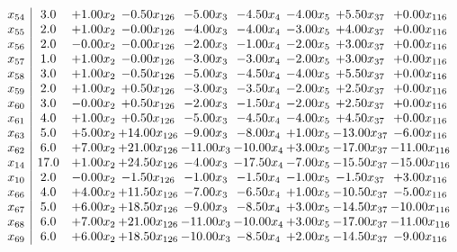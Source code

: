 \documentclass[8pt]{article}
\begin{document}
\[\begin{array}{c| c c@{\hskip 2pt} c@{\hskip 2pt} c@{\hskip 2pt} c@{\hskip 2pt} c@{\hskip 2pt} c@{\hskip 2pt} c@{\hskip 2pt} }
 x_{54}   &  3.0 & +  1.00 x_{2} & -0.50 x_{126} & -5.00 x_{3} & -4.50 x_{4} & -4.00 x_{5} & +  5.50 x_{37} & +  0.00 x_{116}\\
 x_{55}   &  2.0 & +  1.00 x_{2} & -0.00 x_{126} & -4.00 x_{3} & -4.00 x_{4} & -3.00 x_{5} & +  4.00 x_{37} & +  0.00 x_{116}\\
 x_{56}   &  2.0 & -0.00 x_{2} & -0.00 x_{126} & -2.00 x_{3} & -1.00 x_{4} & -2.00 x_{5} & +  3.00 x_{37} & +  0.00 x_{116}\\
 x_{57}   &  1.0 & +  1.00 x_{2} & -0.00 x_{126} & -3.00 x_{3} & -3.00 x_{4} & -2.00 x_{5} & +  3.00 x_{37} & +  0.00 x_{116}\\
 x_{58}   &  3.0 & +  1.00 x_{2} & -0.50 x_{126} & -5.00 x_{3} & -4.50 x_{4} & -4.00 x_{5} & +  5.50 x_{37} & +  0.00 x_{116}\\
 x_{59}   &  2.0 & +  1.00 x_{2} & +  0.50 x_{126} & -3.00 x_{3} & -3.50 x_{4} & -2.00 x_{5} & +  2.50 x_{37} & +  0.00 x_{116}\\
 x_{60}   &  3.0 & -0.00 x_{2} & +  0.50 x_{126} & -2.00 x_{3} & -1.50 x_{4} & -2.00 x_{5} & +  2.50 x_{37} & +  0.00 x_{116}\\
 x_{61}   &  4.0 & +  1.00 x_{2} & +  0.50 x_{126} & -5.00 x_{3} & -4.50 x_{4} & -4.00 x_{5} & +  4.50 x_{37} & +  0.00 x_{116}\\
 x_{63}   &  5.0 & +  5.00 x_{2} & + 14.00 x_{126} & -9.00 x_{3} & -8.00 x_{4} & +  1.00 x_{5} & -13.00 x_{37} & -6.00 x_{116}\\
 x_{62}   &  6.0 & +  7.00 x_{2} & + 21.00 x_{126} & -11.00 x_{3} & -10.00 x_{4} & +  3.00 x_{5} & -17.00 x_{37} & -11.00 x_{116}\\
 x_{14}   &  17.0 & +  1.00 x_{2} & + 24.50 x_{126} & -4.00 x_{3} & -17.50 x_{4} & -7.00 x_{5} & -15.50 x_{37} & -15.00 x_{116}\\
 x_{10}   &  2.0 & -0.00 x_{2} & -1.50 x_{126} & -1.00 x_{3} & -1.50 x_{4} & -1.00 x_{5} & -1.50 x_{37} & +  3.00 x_{116}\\
 x_{66}   &  4.0 & +  4.00 x_{2} & + 11.50 x_{126} & -7.00 x_{3} & -6.50 x_{4} & +  1.00 x_{5} & -10.50 x_{37} & -5.00 x_{116}\\
 x_{67}   &  5.0 & +  6.00 x_{2} & + 18.50 x_{126} & -9.00 x_{3} & -8.50 x_{4} & +  3.00 x_{5} & -14.50 x_{37} & -10.00 x_{116}\\
 x_{68}   &  6.0 & +  7.00 x_{2} & + 21.00 x_{126} & -11.00 x_{3} & -10.00 x_{4} & +  3.00 x_{5} & -17.00 x_{37} & -11.00 x_{116}\\
 x_{69}   &  6.0 & +  6.00 x_{2} & + 18.50 x_{126} & -10.00 x_{3} & -8.50 x_{4} & +  2.00 x_{5} & -14.50 x_{37} & -9.00 x_{116}\\

\end{array}\]
\end{document}
